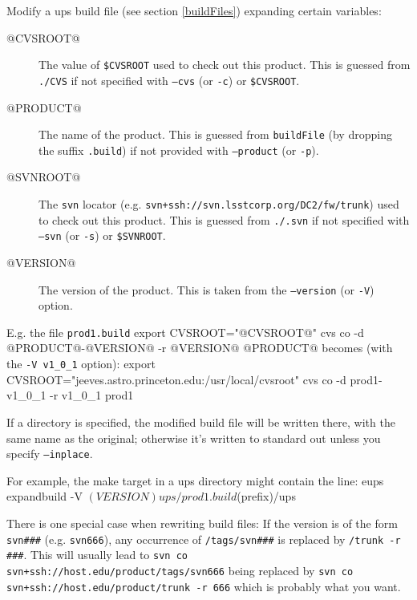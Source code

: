 \documentclass{article}
\newcommand{\code}[1]{\texttt{#1}}
\let\overbatim=\verbatim
\let\oendverbatim=\endverbatim
\renewenvironment{verbatim}
{\center\minipage{16cm}\overbatim}
{\oendverbatim\endminipage\endcenter}
\begin{document}
Modify a ups build file (see section \ref{buildFiles}) expanding certain variables:
\begin{description}
  \item[\small @CVSROOT@] The value of \code{\$CVSROOT} used to check out this product.
    This is guessed from \code{./CVS} if not specified with \code{--cvs} (or \code{-c})
    or \code{\$CVSROOT}.
  \item[\small @PRODUCT@] The name of the product. This is guessed from \code{buildFile}
    (by dropping the suffix \code{.build}) if not provided with \code{--product} (or \code{-p}).
  \item[\small @SVNROOT@] The \code{svn} locator (e.g. \code{svn+ssh://svn.lsstcorp.org/DC2/fw/trunk})
    used to check out this product.
    This is guessed from \code{./.svn} if not specified with \code{--svn} (or \code{-s})
    or \code{\$SVNROOT}.
  \item[\small @VERSION@] The version of the product.  This is taken from the \code{--version} (or
    \code{-V}) option.
\end{description}

E.g. the file \code{prod1.build}
\begin{verbatim}
export CVSROOT="@CVSROOT@"
cvs co -d @PRODUCT@-@VERSION@ -r @VERSION@ @PRODUCT@
\end{verbatim}
becomes (with the \code{-V v1\_0\_1} option):
\begin{verbatim}
export CVSROOT="jeeves.astro.princeton.edu:/usr/local/cvsroot"
cvs co -d prod1-v1_0_1 -r v1_0_1 prod1
\end{verbatim}

If a directory is specified, the modified build file will be written
there, with the same name as the original; otherwise it's written to
standard out unless you specify \code{--inplace}.

For example, the make target in a ups directory might contain the line:
\begin{verbatim}
      eups expandbuild -V $(VERSION) ups/prod1.build $(prefix)/ups
\end{verbatim}

There is one special case when rewriting build files:  If the version
is of the form \code{svn\#\#\#} (e.g. \code{svn666}), any occurrence of
\code{/tags/svn\#\#\#} is replaced by \code{/trunk -r \#\#\#}. This will usually
lead to \code{svn co svn+ssh://host.edu/product/tags/svn666}
being replaced by \code{svn co svn+ssh://host.edu/product/trunk -r 666}
which is probably what you want.
\end{document}
